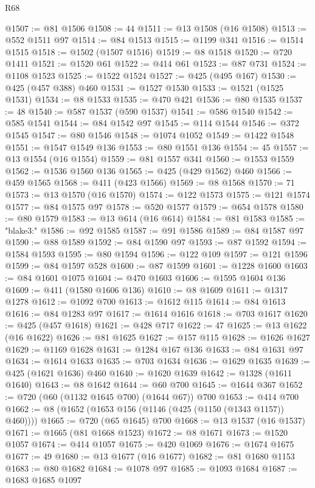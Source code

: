 \begin{lexlean}{R68}
\begin{coremodule}
@1507 := @81 @1506
@1508 := 44
@1511 := @13 @1508 (@16 @1508)
@1513 := @552 @1511 @97
@1514 := @84 @1513
@1515 := @1199 @341
@1516 := @1514 @1515
@1518 := @1502 (@1507 @1516)
@1519 := @8 @1518
@1520 := @720 @1411
@1521 := @1520 @61
@1522 := @414 @61
@1523 := @87 @731
@1524 := @1108 @1523
@1525 := @1522 @1524
@1527 := @425 (@495 @167)
@1530 := @425 (@457 @388) @460
@1531 := @1527 @1530
@1533 := @1521 (@1525 @1531)
@1534 := @8 @1533
@1535 := @470 @421
@1536 := @80 @1535
@1537 := 48
@1540 := @587 @1537 (@590 @1537)
@1541 := @586 @1540
@1542 := @585 @1541
@1544 := @84 @1542 @97
@1545 := @114 @1544
@1546 := @372 @1545
@1547 := @80 @1546
@1548 := @1074 @1052
@1549 := @1422 @1548
@1551 := @1547 @1549 @136
@1553 := @80 @1551 @136
@1554 := 45
@1557 := @13 @1554 (@16 @1554)
@1559 := @81 @1557 @341
@1560 := @1553 @1559
@1562 := @1536 @1560 @136
@1565 := @425 (@429 @1562) @460
@1566 := @459 @1565
@1568 := @411 (@423 @1566)
@1569 := @8 @1568
@1570 := 71
@1573 := @13 @1570 (@16 @1570)
@1574 := @122 @1573
@1575 := @121 @1574
@1577 := @84 @1575 @97
@1578 := @520 @1577
@1579 := @654 @1578
@1580 := @80 @1579
@1583 := @13 @614 (@16 @614)
@1584 := @81 @1583
@1585 := "blake3:"
@1586 := @92 @1585
@1587 := @91 @1586
@1589 := @84 @1587 @97
@1590 := @88 @1589
@1592 := @84 @1590 @97
@1593 := @87 @1592
@1594 := @1584 @1593
@1595 := @80 @1594
@1596 := @122 @109
@1597 := @121 @1596
@1599 := @84 @1597 @528
@1600 := @87 @1599
@1601 := @1228 @1600
@1603 := @84 @1601 @1075
@1604 := @470 @1603
@1606 := @1595 @1604 @136
@1609 := @411 (@1580 @1606 @136)
@1610 := @8 @1609
@1611 := @1317 @1278
@1612 := @1092 @700
@1613 := @1612 @115
@1614 := @84 @1613
@1616 := @84 @1283 @97
@1617 := @1614 @1616
@1618 := @703 @1617
@1620 := @425 (@457 @1618)
@1621 := @428 @717
@1622 := 47
@1625 := @13 @1622 (@16 @1622)
@1626 := @81 @1625
@1627 := @157 @115
@1628 := @1626 @1627
@1629 := @1169 @1628
@1631 := @1284 @167 @136
@1633 := @84 @1631 @97
@1634 := @1614 @1633
@1635 := @703 @1634
@1636 := @1629 @1635
@1639 := @425 (@1621 @1636) @460
@1640 := @1620 @1639
@1642 := @1328 (@1611 @1640)
@1643 := @8 @1642
@1644 := @60 @700
@1645 := @1644 @367
@1652 := @720 (@60 (@1132 @1645 @700) (@1644 @67)) @700
@1653 := @414 @700
@1662 := @8 (@1652 (@1653 @156 (@1146 (@425 (@1150 (@1343 @1157)) @460))))
@1665 := @720 (@65 @1645) @700
@1668 := @13 @1537 (@16 @1537)
@1671 := @1665 (@81 @1668 @1523)
@1672 := @8 @1671
@1673 := @1520 @1057
@1674 := @414 @1057
@1675 := @420 @1069
@1676 := @1674 @1675
@1677 := 49
@1680 := @13 @1677 (@16 @1677)
@1682 := @81 @1680 @1153
@1683 := @80 @1682
@1684 := @1078 @97
@1685 := @1093 @1684
@1687 := @1683 @1685 @1097

\end{coremodule}
\end{lexlean}
